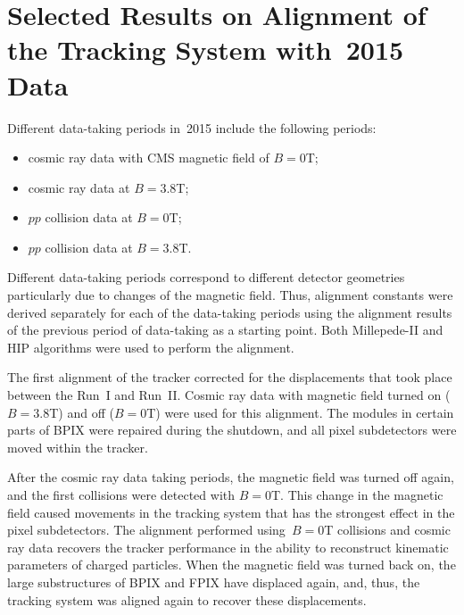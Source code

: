 \section{Selected Results on Alignment of the Tracking System with~2015 Data}
\label{sec:alignmentResults}

Different data-taking periods in~2015 include the following periods:
\begin{itemize}
  \item cosmic ray data with CMS magnetic field of $B=0$T;
  \item cosmic ray data at $B=3.8$T;
  \item $pp$ collision data at $B=0$T;
  \item $pp$ collision data at $B=3.8$T.
\end{itemize}

Different data-taking periods correspond to different detector geometries particularly due to changes of the magnetic field. Thus, alignment constants were derived separately for each of the data-taking periods using the alignment results of the previous period of data-taking as a starting point. Both Millepede-II and HIP algorithms were used to perform the alignment. 

The first alignment of the tracker corrected for the displacements that took place between the Run~I and Run~II. Cosmic ray data with magnetic field turned on ($B=3.8$T) and off ($B=0$T) were used for this alignment. The modules in certain parts of BPIX were repaired during the shutdown, and all pixel subdetectors were moved within the tracker. 

After the cosmic ray data taking periods, the magnetic field was turned off again, and the first collisions were detected with $B=0$T. This change in the magnetic field caused movements in the tracking system that has the strongest effect in the pixel subdetectors. The alignment performed using~$B=0$T collisions and cosmic ray data recovers the tracker performance in the ability to reconstruct kinematic parameters of charged particles. When the magnetic field was turned back on, the large substructures of BPIX and FPIX have displaced again, and, thus, the tracking system was aligned again to recover these displacements.  

